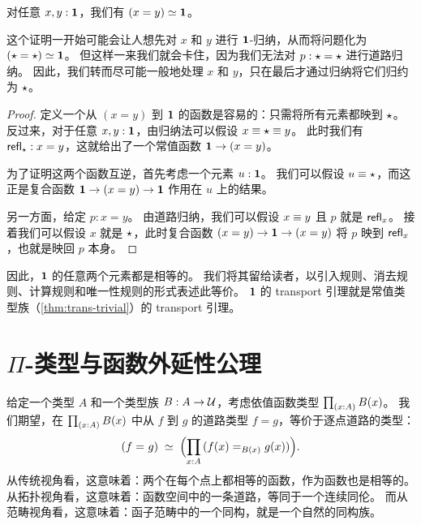 \begin{thm}\label{thm:path-unit}
  对任意 $x,y:\mathbf{1}$，我们有 $(x=y) \simeq \mathbf{1}$。
\end{thm}

这个证明一开始可能会让人想先对 $x$ 和 $y$ 进行 $\mathbf{1}$-归纳，从而将问题化为 $(\star=\star) \simeq \mathbf{1}$。
但这样一来我们就会卡住，因为我们无法对 $p:\star=\star$ 进行道路归纳。
因此，我们转而尽可能一般地处理 $x$ 和 $y$，只在最后才通过归纳将它们归约为 $\star$。

\begin{proof}
  定义一个从 $(x=y)$ 到 $\mathbf{1}$ 的函数是容易的：只需将所有元素都映到 $\star$。
  反过来，对于任意 $x,y:\mathbf{1}$，由归纳法可以假设 $x\equiv \star\equiv y$。
  此时我们有 $\mathsf{refl}_{\star}:x=y$，这就给出了一个常值函数 $\mathbf{1}\to(x=y)$。

  为了证明这两个函数互逆，首先考虑一个元素 $u:\mathbf{1}$。
  我们可以假设 $u\equiv\star$，而这正是复合函数 $\mathbf{1} \to (x=y)\to\mathbf{1}$ 作用在 $u$ 上的结果。

  另一方面，给定 $p:x=y$。
  由道路归纳，我们可以假设 $x\equiv y$ 且 $p$ 就是 $\mathsf{refl}_{x}$。
  接着我们可以假设 $x$ 就是 $\star$，此时复合函数 $(x=y) \to \mathbf{1}\to(x=y)$ 将 $p$ 映到 $\mathsf{refl}_{x}$，也就是映回 $p$ 本身。
\end{proof}

因此，$\mathbf{1}$ 的任意两个元素都是相等的。
我们将其留给读者，以引入规则、消去规则、计算规则和唯一性规则的形式表述此等价。
%
$\mathbf{1}$ 的 transport 引理就是常值类型族（\cref{thm:trans-trivial}）的 transport 引理。

%

\section{\texorpdfstring{$\Pi$}{Π}-类型与函数外延性公理}
\label{sec:compute-pi}

%
%
%
给定一个类型 $A$ 和一个类型族 $B : A \to \mathcal{U}$，考虑依值函数类型 $\prd{x:A}B(x)$。
我们期望，在 $\prd{x:A} B(x)$ 中从 $f$ 到 $g$ 的道路类型 $f=g$，等价于逐点道路的类型：
\begin{equation}
  \eqvspaced{(\id{f}{g})}{\Parens{\prd{x:A} (\id[B(x)]{f(x)}{g(x)})}}.\label{eq:path-forall}
\end{equation}
从传统视角看，这意味着：两个在每个点上都相等的函数，作为函数也是相等的。
%
从拓扑视角看，这意味着：函数空间中的一条道路，等同于一个连续同伦。
%
而从范畴视角看，这意味着：函子范畴中的一个同构，就是一个自然的同构族。


